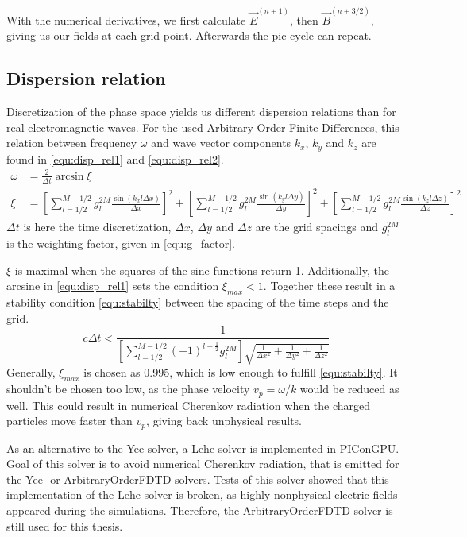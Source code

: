 \documentclass[bachelor_thesis]{subfiles}
\begin{document}
With the numerical derivatives, we first calculate $\vec{E}^{(n+1)}$, then $\vec{B}^{(n+3/2)}$, giving us our fields at each grid point. Afterwards the \gls{pic}-cycle can repeat.

\subsection{Dispersion relation}
Discretization of the phase space yields us different dispersion relations than for real  electromagnetic waves. For the used Arbitrary Order Finite Differences, this relation
between frequency $\omega$ and wave vector components $k_x$, $k_y$ and $k_z$ are found in \autoref{equ:disp_rel1} and \autoref{equ:disp_rel2}.
\begin{align}
\omega&=\frac{2}{\Delta t} \arcsin  \xi 			\label{equ:disp_rel1}	\\
\xi &= \left[\sum\limits_{l=1/2}^{M - 1/2} g_l^{2M} \frac{\sin( k_x l \Delta x)}{\Delta x} \right]^2
	+ \left[\sum\limits_{l=1/2}^{M - 1/2} g_l^{2M} \frac{\sin( k_y l \Delta y)}{\Delta y} \right]^2 + \left[\sum\limits_{l=1/2}^{M - 1/2} g_l^{2M} \frac{\sin( k_z l \Delta z)}{\Delta z} \right]^2 	\label{equ:disp_rel2}
\end{align}
$\Delta t$ is here the time discretization, $\Delta x$, $\Delta y$ and $\Delta z$ are the grid spacings and $g_l^{2M}$ is the weighting factor, given in \autoref{equ:g_factor}.

$\xi$ is maximal when the squares of the sine functions return 1. Additionally, the arcsine in \autoref{equ:disp_rel1} sets the condition $\xi_{max} < 1$.
Together these result in a stability condition \autoref{equ:stabilty} between the spacing of the time steps and the grid.
\begin{equation}
c\Delta t < \frac{1}{ \left[ \sum\limits_{l=1/2}^{M - 1/2} (-1)^{l-\frac{1}{2}} g_l^{2M} \right] \sqrt{ \frac{1}{\Delta x^2} + \frac{1}{\Delta y^2} + \frac{1}{\Delta z^2} }}
\label{equ:stabilty}
\end{equation}
Generally, $\xi_{max}$ is chosen as 0.995, which is low enough to fulfill \autoref{equ:stabilty}. It shouldn't be chosen too low, as the phase velocity $v_p=\omega/k$
would be reduced as well. This could result in numerical Cherenkov radiation when the charged particles move faster than $v_p$, giving back unphysical results.

As an alternative to the Yee-solver, a Lehe-solver \cite{Lehe2013} is implemented in PIConGPU. Goal of this solver is to avoid numerical Cherenkov radiation, that is emitted for the Yee- or ArbitraryOrderFDTD solvers.
Tests of this solver showed that this implementation of the Lehe solver is broken, as highly nonphysical electric fields appeared during the simulations. Therefore, the ArbitraryOrderFDTD solver is still used for this thesis.
\end{document}
